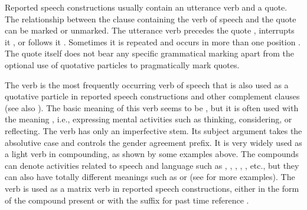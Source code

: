 Reported speech constructions usually contain an utterance verb and a quote. The relationship between the clause containing the verb of speech and the quote can be marked or unmarked. The utterance verb precedes the quote , interrupts it , or follows it . Sometimes it is repeated and occurs in more than one position . The quote itself does not bear any specific grammatical marking apart from the optional use of quotative particles to pragmatically mark quotes.

The verb  is the most frequently occurring verb of speech that is also used as a quotative particle in reported speech constructions and other complement clauses (see also ). The basic meaning of this verb seems to be , but it is often used with the meaning , i.e., expressing mental activities such as thinking, considering, or reflecting. The verb has only an imperfective stem. Its subject argument takes the absolutive case and controls the gender agreement prefix. It is very widely used as a light verb in compounding, as shown by some examples above. The compounds can denote activities related to speech and language such as  ,  ,  ,  ,  , etc., but they can also have totally different meanings such as   or   (see  for more examples). The verb is used as a matrix verb in reported speech constructions, either in the form of the compound present  or with the suffix  for past time reference .
%
